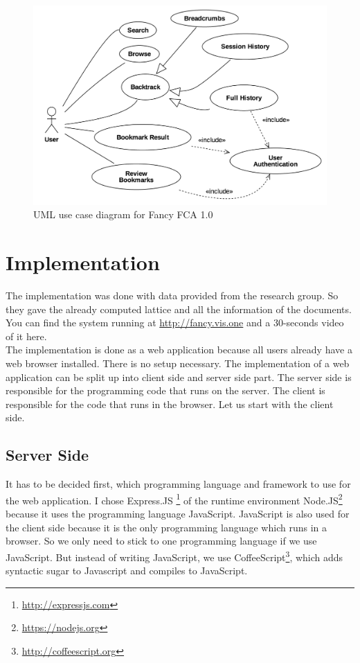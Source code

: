 \documentclass[11pt]{report}
\begin{document}
\begin{figure}[!ht]
	\centering
	\includegraphics[width=\linewidth]{images/usecase}
\caption{UML use case diagram for Fancy FCA 1.0}
\label{figure:usecase}
\end{figure}

\section{Implementation}

The implementation was done with data provided from the research group. So they gave the already computed lattice and all the information of the documents. You can find the system running at \url{http://fancy.vis.one} and a 30-seconds video of it here. \\

The implementation is done as a web application because all users already have a web browser installed. There is no setup necessary. The implementation of a web application can be split up into client side  and server side part. The server side is responsible for the programming code that runs on the server. The client is responsible for the code that runs in the browser. Let us start with the client side.

\subsection{Server Side}

It has to be decided first, which programming language and framework to use for the web application. I chose Express.JS \footnote{\url{http://expressjs.com}} of the runtime environment Node.JS\footnote{\url{https://nodejs.org}} because it uses the programming language JavaScript. JavaScript is also used for the client side because it is the only programming language which runs in a browser. So we only need to stick to one programming language if we use JavaScript. But instead of writing JavaScript, we use CoffeeScript\footnote{\url{http://coffeescript.org}}, which adds \gls{syntactic sugar} to Javascript and compiles to JavaScript.\\
\end{document}
